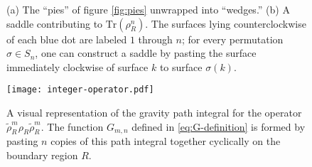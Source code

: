 \documentclass[a4paper,11pt]{article}
\renewcommand{\tr}{\text{Tr}}
\renewcommand{\tilde}{\widetilde}
\begin{document}
\begin{figure}
    \centering
    \caption{(a) The ``pies'' of figure \ref{fig:pies} unwrapped into ``wedges.'' (b) A saddle contributing to $\tr(\rho_R^n)$. The surfaces lying counterclockwise of each blue dot are labeled $1$ through $n$; for every permutation $\sigma \in S_n$, one can construct a saddle by pasting the surface immediately clockwise of surface $k$ to surface $\sigma(k).$}
\end{figure}

\begin{figure}
    \centering
    \texttt{[image: integer-operator.pdf]}
    \caption{A visual representation of the gravity path integral for the operator $\tilde{\rho}^m_R \rho_R \tilde{\rho}^m_R.$ The function $G_{m,n}$ defined in \eqref{eq:G-definition} is formed by pasting $n$ copies of this path integral together cyclically on the boundary region $R$.}
    \label{fig:integer-operator}
\end{figure}
\end{document}
